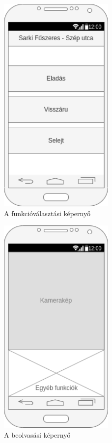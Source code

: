 \documentclass[12pt,a4paper]{article}
\begin{document}
	\begin{figure}[H]
		\centering
		\includegraphics[width=0.5\textwidth]{img/functionselect.png}
		\caption{A funkcióválasztási képernyő}
		\label{fig:fnselect}
	\end{figure}
	
	\begin{figure}[H]
		\centering
		\includegraphics[width=0.5\textwidth]{img/scan.png}
		\caption{A beolvasási képernyő}
		\label{fig:scan}
	\end{figure}
	
\end{document}
